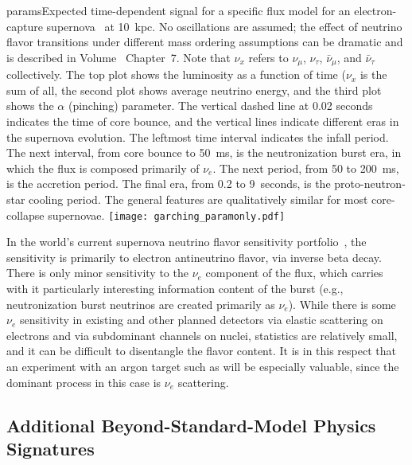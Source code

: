 \begin{dunefigure}{params}{Expected
  time-dependent signal for a specific flux model for an
  electron-capture supernova~\cite{Huedepohl:2009wh} at 10~kpc.  No oscillations are assumed; the effect of neutrino flavor transitions under different mass ordering assumptions can be dramatic and is described in Volume~\volnumberphysics{} Chapter~7. 
  Note that $\nu_x$  refers to $\nu_\mu$,
$\nu_\tau$, $\bar{\nu}_\mu$, and $\bar{\nu}_{\tau}$ collectively. The
  top plot shows the luminosity as a function of time ($\nu_x$ is the sum of all, the second plot
  shows average neutrino energy, and the third plot shows the $\alpha$
  (pinching) parameter.  The vertical dashed line at 0.02 seconds indicates
  the time of core bounce, and the vertical lines indicate different
  eras in the supernova evolution.  The leftmost time interval
  indicates the infall period.  The next interval, from core bounce to
  50~ms, is the neutronization burst era, in which the flux is
  composed primarily of $\nu_e$.  The next period, from 50 to 200~ms,
  is the accretion period. The final era, from 0.2 to 9~seconds, is
  the proto-neutron-star cooling period.  The general features are
  qualitatively similar for most core-collapse supernovae.}
\texttt{[image: garching\_paramonly.pdf]}
\end{dunefigure}

In the world's current supernova neutrino flavor sensitivity
portfolio~\cite{Scholberg:2012id, Mirizzi:2015eza}, the sensitivity 
is primarily to electron antineutrino flavor, via inverse beta decay.  
There is only minor sensitivity to the $\nu_e$
component of the flux, which carries with it particularly interesting 
information content of the burst (e.g., neutronization burst neutrinos
are created primarily as $\nu_e$).  While there is some $\nu_e$
sensitivity in existing and other planned detectors via elastic 
scattering on electrons and via subdominant channels on nuclei, 
statistics are relatively small,
and it can be difficult to disentangle the flavor content.  It is 
in this respect that an experiment with an argon target such as  
will be especially valuable, since the dominant process in 
this case is $\nu_e$  scattering.


\subsection{Additional Beyond-Standard-Model Physics Signatures}

